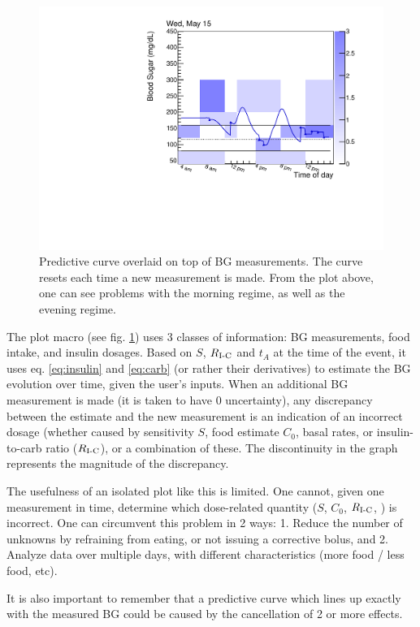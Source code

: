 \begin{figure}[htbp]
\begin{center}
\includegraphics[width=4.5in]{figures/example_predictive.pdf}
\caption{Predictive curve overlaid on top of BG measurements. The curve resets each time a new 
measurement is made. From the plot above, one can see problems with the morning regime, as well as 
the evening regime. 
}
\label{fig:predictive}
\end{center}
\end{figure}

The plot macro (see fig. \ref{fig:predictive}) uses 3 classes of information: BG measurements, food 
intake, and insulin dosages. Based on $S$, $R_\text{I-C}$ and $t_A$ at the time of the event, it uses 
eq. \ref{eq:insulin} and \ref{eq:carb} (or rather their derivatives) to estimate the BG evolution 
over time, given the user's inputs. When an additional BG measurement is made (it is taken to have 0 
uncertainty), any discrepancy between the estimate and the new measurement is an indication of an 
incorrect dosage (whether caused by sensitivity $S$, food estimate $C_0$, basal rates, or 
insulin-to-carb ratio ($R_\text{I-C}$), or a combination of these. The discontinuity in the graph represents 
the magnitude of the discrepancy.

The usefulness of an isolated plot like this is limited. One cannot, given one measurement in time, 
determine which dose-related quantity ($S$, $C_0$, $R_\text{I-C}$, \rbas) is incorrect. One can circumvent 
this problem in 2 ways: 1. Reduce the number of unknowns by refraining from eating, or not issuing 
a corrective bolus, and 2. Analyze data over multiple days, with different characteristics (more 
food / less food, etc). 

It is also important to remember that a predictive curve which lines up exactly with the measured 
BG could be caused by the cancellation of 2 or more effects.

